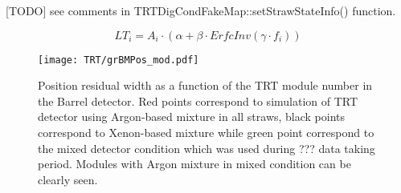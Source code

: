 
[TODO] see comments in TRTDigCondFakeMap::setStrawStateInfo() function.


\begin{equation}
 LT_i = A_i \cdot (\alpha + \beta \cdot ErfcInv(\gamma \cdot f_i)) %
\end{equation}





\begin{figure}
\begin{center}
 \texttt{[image: TRT/grBMPos\_mod.pdf]}
\caption{ Position residual width as a function of the TRT module number in the Barrel detector. Red points correspond to simulation of TRT detector
using Argon-based mixture in all straws, black points correspond to Xenon-based mixture while green point correspond to the mixed detector condition
which was used during ??? data taking period. Modules with Argon mixture in mixed condition can be clearly seen.}
\label{fig:meanFreePath}
\end{center}
\end{figure}




